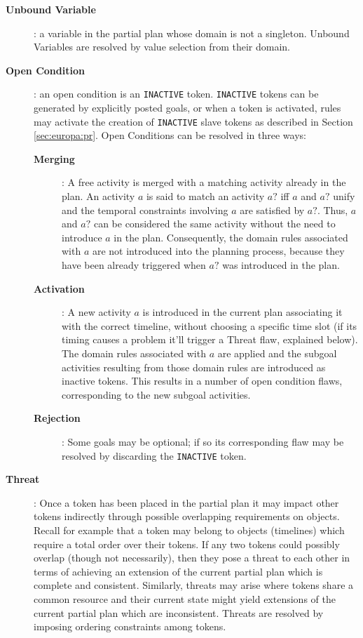 \begin{description}

\item[\textbf{Unbound Variable}]: a variable in the partial plan whose
  domain is not a singleton. Unbound Variables are resolved by value
  selection from their domain.

\item[\textbf{Open Condition}]: an open condition is an
  \texttt{INACTIVE} token. \texttt{INACTIVE} tokens can be generated
  by explicitly posted goals, or when a token is activated, rules may
  activate the creation of \texttt{INACTIVE} slave tokens as described
  in Section \ref{sec:europa:pr}. Open Conditions can be resolved in
  three ways:

  \begin{description}

  \item[\textbf{Merging}]: A free activity is merged with a matching
    activity already in the plan. An activity $a$ is said to match an
    activity $a?$ iff $a$ and $a?$ unify \cite{russelnorvig} and the
    temporal constraints involving $a$ are satisfied by $a?$. Thus,
    $a$ and $a?$ can be considered the same activity without the need
    to introduce $a$ in the plan. Consequently, the domain rules associated with
    $a$ are not introduced into the planning process, because they have been already
    triggered when $a?$ was introduced in the plan.

  \item[\textbf{Activation}]: A new activity $a$ is introduced in the
    current plan associating it with the correct timeline, without
    choosing a specific time slot (if its timing causes a problem 
    it'll trigger a Threat flaw, explained below). 
    The domain rules associated with $a$ are applied and the subgoal
    activities resulting from those domain rules are introduced as inactive tokens. 
    This results in a number of open condition flaws, corresponding to
    the new subgoal activities.

  \item[\textbf{Rejection}]: Some goals may be optional; if so its
    corresponding flaw may be resolved by discarding the
    \texttt{INACTIVE} token.

  \end{description}

\item[\textbf{Threat}]: Once a token has been placed in the partial
  plan it may impact other tokens indirectly through possible
  overlapping requirements on objects. Recall for example that a token
  may belong to objects (\eg timelines) which require a total order
  over their tokens. If any two tokens could possibly overlap (though
  not necessarily), then they pose a threat to each other in terms of
  achieving an extension of the current partial plan which is complete
  and consistent. Similarly, threats may arise where tokens share a
  common resource and their current state might yield extensions of
  the current partial plan which are inconsistent. Threats are
  resolved by imposing ordering constraints among tokens.

\end{description}

